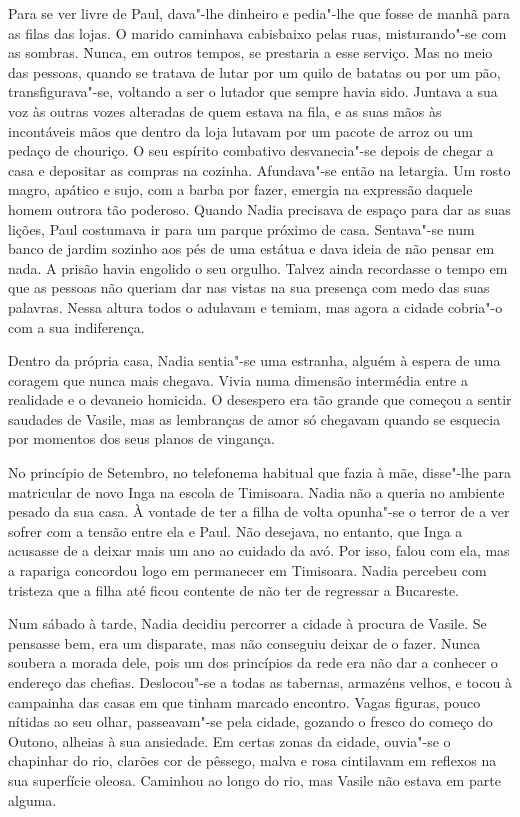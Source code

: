 Para se ver livre de Paul, dava"-lhe dinheiro e pedia"-lhe que fosse de
manhã para as filas das lojas. O marido caminhava cabisbaixo pelas
ruas, misturando"-se com as sombras. Nunca, em outros tempos, se
prestaria a esse serviço. Mas no meio das pessoas, quando se tratava de
lutar por um quilo de batatas ou por um pão, transfigurava"-se, voltando
a ser o lutador que sempre havia sido. Juntava a sua voz às outras vozes
alteradas de quem estava na fila, e as suas mãos às incontáveis mãos que
dentro da loja lutavam por um pacote de arroz ou um pedaço de
chouriço. O seu espírito combativo desvanecia"-se depois de chegar a
casa e depositar as compras na cozinha. Afundava"-se então na letargia.
Um rosto magro, apático e sujo, com a barba por fazer, emergia na
expressão daquele homem outrora tão poderoso. Quando Nadia precisava de
espaço para dar as suas lições, Paul costumava ir para um parque próximo
de casa. Sentava"-se num banco de jardim sozinho aos pés de uma estátua e
dava ideia de não pensar em nada. A prisão havia engolido o seu orgulho.
Talvez ainda recordasse o tempo em que as pessoas não queriam dar nas
vistas na sua presença com medo das suas palavras. Nessa altura todos o
adulavam e temiam, mas agora a cidade
cobria"-o com a sua indiferença.

Dentro da própria casa, Nadia sentia"-se uma estranha, alguém à espera de
uma coragem que nunca mais chegava. Vivia numa dimensão intermédia entre
a realidade e o devaneio homicida. O desespero era tão grande que começou a sentir saudades de Vasile, mas as lembranças de amor só chegavam
quando se esquecia por momentos dos seus planos de vingança.

No princípio de Setembro, no telefonema habitual que fazia à mãe,
disse"-lhe para matricular de novo Inga na escola de Timisoara. Nadia não
a queria no ambiente pesado da sua casa. À vontade de ter a filha de
volta opunha"-se o terror de a ver sofrer com a tensão entre ela e Paul.
Não desejava, no entanto, que Inga a acusasse de a deixar mais um ano ao
cuidado da avó. Por isso, falou com ela, mas a rapariga concordou logo
em permanecer em Timisoara. Nadia percebeu com tristeza que a filha até
ficou contente de não ter de regressar a Bucareste.

Num sábado à tarde, Nadia decidiu percorrer a cidade à procura de
Vasile. Se pensasse bem, era um disparate, mas não conseguiu deixar de o
fazer. Nunca soubera a morada dele, pois um dos princípios da rede era
não dar a conhecer o endereço das chefias. Deslocou"-se a todas as
tabernas, armazéns velhos, e tocou à campainha das casas em que tinham
marcado encontro. Vagas figuras, pouco nítidas ao seu olhar,
passeavam"-se pela cidade, gozando o fresco do começo do Outono, alheias
à sua ansiedade. Em certas zonas da cidade, ouvia"-se o chapinhar do rio,
clarões cor de pêssego, malva e rosa cintilavam em reflexos na sua
superfície oleosa. Caminhou ao longo do rio, mas Vasile não estava em
parte alguma.

